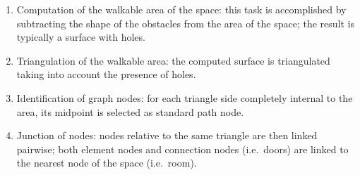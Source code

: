 \begin{enumerate}
\def\labelenumi{\arabic{enumi}.}
\itemsep1pt\parskip0pt
\item
 Computation of the walkable area of the space: this task is
 accomplished by subtracting the shape of the obstacles from the area
 of the space; the result is typically a surface with holes.
\item
 Triangulation of the walkable area: the computed surface is
 triangulated taking into account the presence of holes.
\item
 Identification of graph nodes: for each triangle side completely
 internal to the area, its midpoint is selected as standard path node.
\item
 Junction of nodes: nodes relative to the same triangle are then linked
 pairwise; both element nodes and connection nodes (i.e.~doors) are
 linked to the nearest node of the space (i.e.~room).
\end{enumerate}

